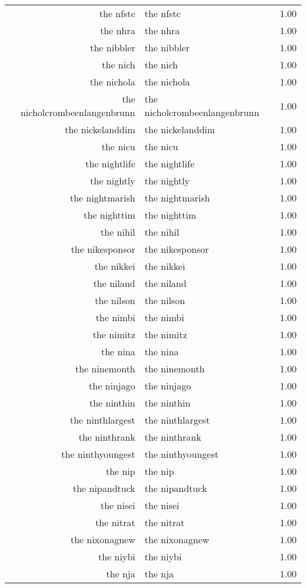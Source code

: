 \begin{table}[ht]
\begin{tabular}{rlr}
  the nfstc & the nfstc & 1.00 \\ 
  the nhra & the nhra & 1.00 \\ 
  the nibbler & the nibbler & 1.00 \\ 
  the nich & the nich & 1.00 \\ 
  the nichola & the nichola & 1.00 \\ 
  the nicholcrombeenlangenbrunn & the nicholcrombeenlangenbrunn & 1.00 \\ 
  the nickelanddim & the nickelanddim & 1.00 \\ 
  the nicu & the nicu & 1.00 \\ 
  the nightlife & the nightlife & 1.00 \\ 
  the nightly & the nightly & 1.00 \\ 
  the nightmarish & the nightmarish & 1.00 \\ 
  the nighttim & the nighttim & 1.00 \\ 
  the nihil & the nihil & 1.00 \\ 
  the nikesponsor & the nikesponsor & 1.00 \\ 
  the nikkei & the nikkei & 1.00 \\ 
  the niland & the niland & 1.00 \\ 
  the nilson & the nilson & 1.00 \\ 
  the nimbi & the nimbi & 1.00 \\ 
  the nimitz & the nimitz & 1.00 \\ 
  the nina & the nina & 1.00 \\ 
  the ninemonth & the ninemonth & 1.00 \\ 
  the ninjago & the ninjago & 1.00 \\ 
  the ninthin & the ninthin & 1.00 \\ 
  the ninthlargest & the ninthlargest & 1.00 \\ 
  the ninthrank & the ninthrank & 1.00 \\ 
  the ninthyoungest & the ninthyoungest & 1.00 \\ 
  the nip & the nip & 1.00 \\ 
  the nipandtuck & the nipandtuck & 1.00 \\ 
  the nisei & the nisei & 1.00 \\ 
  the nitrat & the nitrat & 1.00 \\ 
  the nixonagnew & the nixonagnew & 1.00 \\ 
  the niybi & the niybi & 1.00 \\ 
  the nja & the nja & 1.00 \\ 

\end{tabular}
\end{table}
